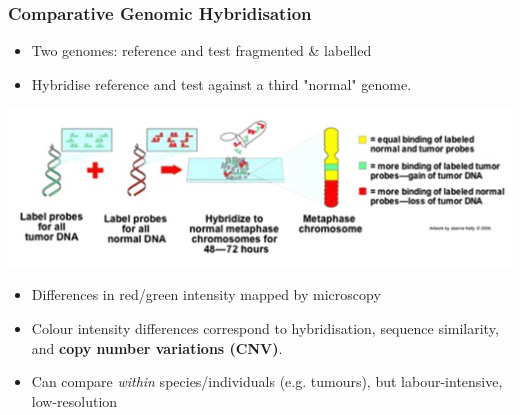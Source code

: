 
%
\begin{frame}
  \frametitle{Comparative Genomic Hybridisation}
  \begin{itemize}
    \item Two genomes: \textcolor{RawSienna}{reference} and \textcolor{hutton_green}{test} fragmented \& labelled
    \item Hybridise \textcolor{RawSienna}{reference} and \textcolor{hutton_green}{test} against a third \textcolor{hutton_blue}{"normal"} genome.
  \end{itemize}
  \begin{center}
    \includegraphics[width=\textwidth]{images/cgh}
  \end{center}  
  \begin{itemize}
    \item Differences in \textcolor{RawSienna}{red}/\textcolor{hutton_green}{green} intensity mapped by microscopy
    \item \textcolor{hutton_blue}{Colour intensity differences correspond to hybridisation, sequence similarity, and \textbf{copy number variations (CNV)}.}
    \item \textcolor{hutton_purple}{Can compare \textit{within} species/individuals (e.g. tumours), but labour-intensive, low-resolution}
  \end{itemize}  
\end{frame}

